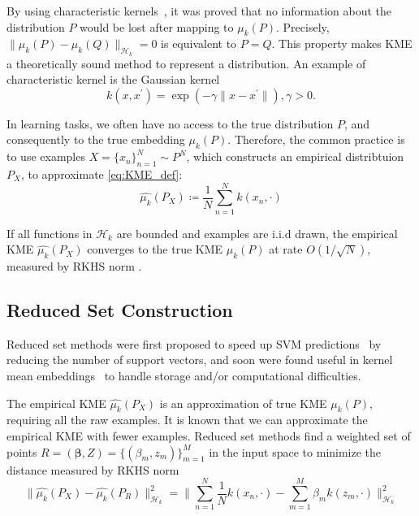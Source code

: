 \documentclass[paper=letter, fontsize=20pt]{article}
\begin{document}
By using characteristic kernels~\citep{Fukumizu07}, it was proved that no information about the distribution $P$ would be lost after mapping to $\mu_k(P)$. Precisely, $\lVert \mu_k(P)-\mu_k(Q) \rVert_{\mathcal{H}_k}=0$ is equivalent to $P=Q $. This property makes KME a theoretically sound method to represent a distribution. An example of characteristic kernel is the Gaussian kernel
 \begin{equation} \label{eq:gaussian_kernel}
     k(x,x^\prime)=\exp(-\gamma \lVert x-x^\prime \rVert), \gamma>0.
 \end{equation}

 In learning tasks, we often have no access to the true distribution $P$, and consequently to the true embedding $\mu_k(P)$. Therefore, the common practice is to use examples $X=\{x_n\}_{n=1}^N\sim P^N$, which constructs an empirical distribtuion $P_X$, to approximate \eqref{eq:KME_def}:
\begin{equation}\label{eq:KME_empirical}
    \widehat{\mu_k}(P_X)\coloneqq \frac{1}{N}\sum_{n=1}^{N} k(x_n,\cdot)
\end{equation}

If all functions in $\mathcal{H}_k$ are bounded and examples are i.i.d drawn, the empirical KME $\widehat{\mu_k}(P_X)$ converges to the true KME $\mu_k(P)$ at rate $O(1/\sqrt{N})$, measured by RKHS norm \cite[Theorem 1]{Lopez15}.

\subsection{Reduced Set Construction}
Reduced set methods were first proposed to speed up SVM predictions~\citep{SVM_RS} by reducing the number of support vectors, and soon were found useful in kernel mean embeddings~\citep{TNN99_RS} to handle storage and/or computational difficulties.

The empirical KME $\widehat{\mu_k}(P_X)$ is an approximation of true KME $\mu_k(P)$, requiring all the raw examples. It is known that we can approximate the empirical KME with fewer examples. Reduced set methods find a weighted set of points $R=(\bm{\beta},Z)=\{(\beta_m,z_m) \}_{m=1}^M$ in the input space to minimize the distance measured by RKHS norm
\begin{equation}\label{eq:rs_obj}
   \lVert\widehat{\mu_k}(P_X)-\widehat{\mu_k}(P_R) \rVert_{\mathcal{H}_k}^2=\Big\lVert\sum_{n=1}^{N}\frac{1}{N} k(x_n,\cdot)-\sum_{m=1}^{M} \beta_m k(z_m,\cdot) \Big\rVert_{\mathcal{H}_k}^2
\end{equation}
\end{document}
